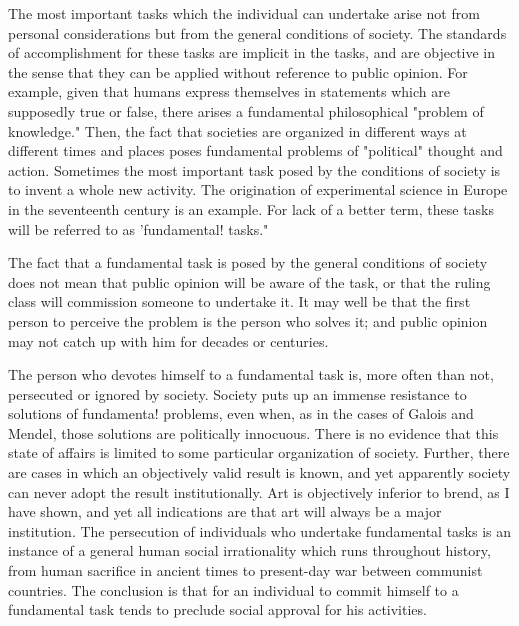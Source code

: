 \documentclass[10pt,twoside,draft]{memoir}
\begin{document}
{{{The most important tasks which the individual can undertake arise not 
from personal considerations but from the general conditions of society. The 
standards of accomplishment for these tasks are implicit in the tasks, and are 
objective in the sense that they can be applied without reference to public 
opinion. For example, given that humans express themselves in statements 
which are supposedly true or false, there arises a fundamental philosophical 
"problem of knowledge." Then, the fact that societies are organized in 
different ways at different times and places poses fundamental problems of 
"political" thought and action. Sometimes the most important task posed by 
the conditions of society is to invent a whole new activity. The origination 
of experimental science in Europe in the seventeenth century is an example. 
For lack of a better term, these tasks will be referred to as 'fundamental! 
tasks." 

The fact that a fundamental task is posed by the general conditions of 
society does not mean that public opinion will be aware of the task, or that 
the ruling class will commission someone to undertake it. It may well be that 
the first person to perceive the problem is the person who solves it; and 
public opinion may not catch up with him for decades or centuries. 

The person who devotes himself to a fundamental task is, more often 
than not, persecuted or ignored by society. Society puts up an immense 
resistance to solutions of fundamenta! problems, even when, as in the cases 
of Galois and Mendel, those solutions are politically innocuous. There is no 
evidence that this state of affairs is limited to some particular organization of 
society. Further, there are cases in which an objectively valid result is 
known, and yet apparently society can never adopt the result institutionally. 
Art is objectively inferior to brend, as I have shown, and yet all indications 
are that art will always be a major institution. The persecution of individuals 
who undertake fundamental tasks is an instance of a general human social 
irrationality which runs throughout history, from human sacrifice in ancient 
times to present-day war between communist countries. The conclusion is 
that for an individual to commit himself to a fundamental task tends to 
preclude social approval for his activities. 

}}}
\end{document}
